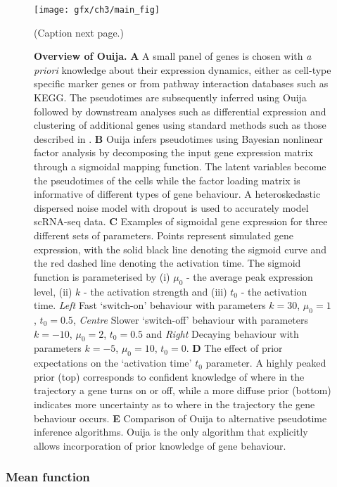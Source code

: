 \begin{figure}%
	\centering
	\texttt{[image: gfx/ch3/main\_fig]}
  \caption{(Caption next page.)} \label{fig:main}
\end{figure}
\addtocounter{figure}{-1}
\begin{figure}
  \caption{{\bf Overview of Ouija.}
  \textbf{A} A small panel of genes is chosen with \emph{a priori} knowledge about their expression dynamics, either as cell-type specific marker genes or from pathway interaction databases such as KEGG. The pseudotimes are subsequently inferred using Ouija followed by downstream analyses such as differential expression and clustering of additional genes  using standard methods such as those described in \cite{Trapnell2014}.
  \textbf{B} Ouija infers pseudotimes using Bayesian nonlinear factor analysis by decomposing the input gene expression matrix through a sigmoidal mapping function. The latent variables become the pseudotimes of the cells while the factor loading matrix is informative of different types of gene behaviour. A heteroskedastic dispersed noise model with dropout is used to accurately model scRNA-seq data.
  \textbf{C}  Examples of sigmoidal gene expression for three different sets of parameters. Points represent simulated gene expression, with the solid black line denoting the sigmoid curve and the red dashed line denoting the activation time.
  The sigmoid function is parameterised by (i) $\mu_0$ - the average peak expression level, (ii) $k$ - the activation strength and (iii) $t_0$ - the activation time. \emph{Left} Fast `switch-on' behaviour with parameters $k= 30$, $\mu_0 = 1$, $t_0 = 0.5$, \emph{Centre} Slower `switch-off' behaviour with parameters $k= -10$, $\mu_0 = 2$, $t_0 = 0.5$ and \emph{Right} Decaying behaviour with parameters $k= -5$, $\mu_0 = 10$, $t_0 = 0$.
  \textbf{D} The effect of prior expectations on the `activation time' $t_0$ parameter. A highly peaked prior (top) corresponds to confident knowledge of where in the trajectory a gene turns on or off, while a more diffuse prior (bottom) indicates more uncertainty as to where in the trajectory the gene behaviour occurs.
  \textbf{E} Comparison of Ouija to alternative pseudotime inference algorithms. Ouija is the only algorithm that explicitly allows incorporation of prior knowledge of gene behaviour.}
\end{figure}


\subsubsection{Mean function}

